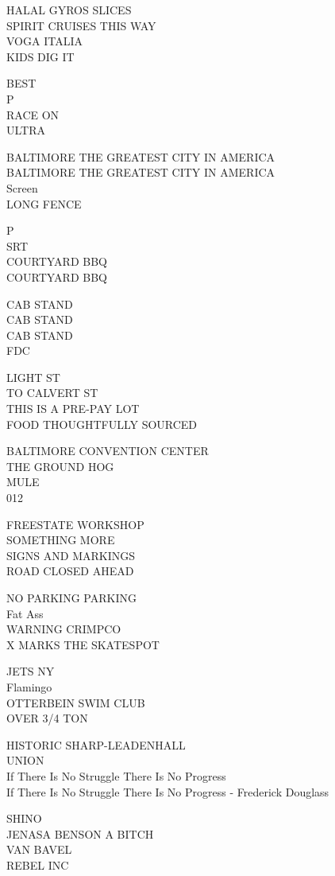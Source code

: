 \documentclass[10pt,letterpaper]{article}
\begin{document}
HALAL GYROS SLICES\\
SPIRIT CRUISES THIS WAY\\
VOGA ITALIA\\
KIDS DIG IT

BEST\\
P\\
RACE ON\\
ULTRA

BALTIMORE THE GREATEST CITY IN AMERICA\\
BALTIMORE THE GREATEST CITY IN AMERICA\\
Screen\\
LONG FENCE

P\\
SRT\\
COURTYARD BBQ\\
COURTYARD BBQ

CAB STAND\\
CAB STAND\\
CAB STAND\\
FDC

LIGHT ST\\
TO CALVERT ST\\
THIS IS A PRE{-}PAY LOT\\
FOOD THOUGHTFULLY SOURCED

BALTIMORE CONVENTION CENTER\\
THE GROUND HOG\\
MULE\\
012

FREESTATE WORKSHOP\\
SOMETHING MORE\\
SIGNS AND MARKINGS\\
ROAD CLOSED AHEAD

NO PARKING PARKING\\
Fat Ass\\
WARNING CRIMPCO\\
X MARKS THE SKATESPOT

JETS NY\\
Flamingo\\
OTTERBEIN SWIM CLUB\\
OVER 3/4 TON

HISTORIC SHARP{-}LEADENHALL\\
UNION\\
If There Is No Struggle There Is No Progress\\
If There Is No Struggle There Is No Progress {-} Frederick Douglass

SHINO\\
JENASA BENSON A BITCH\\
VAN BAVEL\\
REBEL INC
\end{document}
